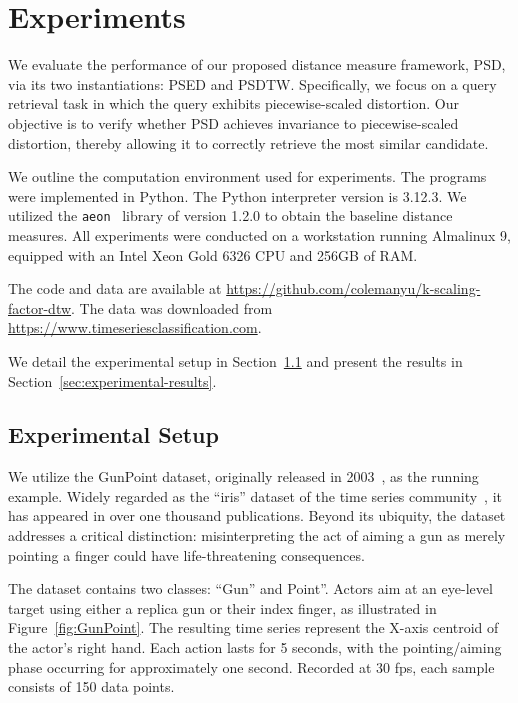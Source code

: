 \section{Experiments} \label{sec:experiment}

We evaluate the performance of our proposed distance measure framework, PSD, via its two instantiations: PSED and PSDTW. 
Specifically, we focus on a query retrieval task in which the query exhibits piecewise-scaled distortion.
Our objective is to verify whether PSD achieves invariance to piecewise-scaled distortion, thereby allowing it to correctly retrieve the most similar candidate. 

We outline the computation environment used for experiments.
The programs were implemented in Python.
The Python interpreter version is 3.12.3.
We utilized the \texttt{aeon}~\cite{middlehurst2024aeon} library of version 1.2.0 to obtain the baseline distance measures. 
All experiments were conducted on a workstation running Almalinux 9, equipped with an Intel Xeon Gold 6326 CPU and 256GB of RAM.


The code and data are available at \url{https://github.com/colemanyu/k-scaling-factor-dtw}.
The data was downloaded from \url{https://www.timeseriesclassification.com}.

We detail the experimental setup in Section~\ref{sec:experimental-setup} and present the results in Section~\ref{sec:experimental-results}.

\subsection{Experimental Setup} \label{sec:experimental-setup} %

We utilize the GunPoint dataset, originally released in 2003~\cite{ratanamahatana2004everything}, as the running example. 
Widely regarded as the ``iris'' dataset of the time series community~\cite{dau2019ucra}, it has appeared in over one thousand publications. 
Beyond its ubiquity, the dataset addresses a critical distinction: misinterpreting the act of aiming a gun as merely pointing a finger could have life-threatening consequences.

 

The dataset contains two classes: ``Gun'' and Point''. Actors aim at an eye-level target using either a replica gun or their index finger, as illustrated in Figure~\ref{fig:GunPoint}. 
The resulting time series represent the X-axis centroid of the actor's right hand. 
Each action lasts for 5 seconds, with the pointing/aiming phase occurring for approximately one second. 
Recorded at 30 fps, each sample consists of 150 data points. 

